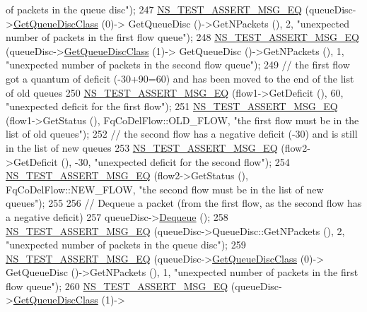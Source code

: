 \begin{DoxyCode}
{       of packets in the queue disc"});
247   \hyperlink{group__testing_ga2a9d78cffb3db8e867c35fff0b698cf5}{NS\_TEST\_ASSERT\_MSG\_EQ} (queueDisc->\hyperlink{classns3_1_1QueueDisc_a584d228f7bff3f754d32793a38134556}{GetQueueDiscClass} (0)->
      GetQueueDisc ()->GetNPackets (), 2, \textcolor{stringliteral}{"unexpected number of packets in the first flow queue"});
248   \hyperlink{group__testing_ga2a9d78cffb3db8e867c35fff0b698cf5}{NS\_TEST\_ASSERT\_MSG\_EQ} (queueDisc->\hyperlink{classns3_1_1QueueDisc_a584d228f7bff3f754d32793a38134556}{GetQueueDiscClass} (1)->
      GetQueueDisc ()->GetNPackets (), 1, \textcolor{stringliteral}{"unexpected number of packets in the second flow queue"});
249   \textcolor{comment}{// the first flow got a quantum of deficit (-30+90=60) and has been moved to the end of the list of old
       queues}
250   \hyperlink{group__testing_ga2a9d78cffb3db8e867c35fff0b698cf5}{NS\_TEST\_ASSERT\_MSG\_EQ} (flow1->GetDeficit (), 60, \textcolor{stringliteral}{"unexpected deficit for the first
       flow"});
251   \hyperlink{group__testing_ga2a9d78cffb3db8e867c35fff0b698cf5}{NS\_TEST\_ASSERT\_MSG\_EQ} (flow1->GetStatus (), FqCoDelFlow::OLD\_FLOW, \textcolor{stringliteral}{"the first flow
       must be in the list of old queues"});
252   \textcolor{comment}{// the second flow has a negative deficit (-30) and is still in the list of new queues}
253   \hyperlink{group__testing_ga2a9d78cffb3db8e867c35fff0b698cf5}{NS\_TEST\_ASSERT\_MSG\_EQ} (flow2->GetDeficit (), -30, \textcolor{stringliteral}{"unexpected deficit for the second
       flow"});
254   \hyperlink{group__testing_ga2a9d78cffb3db8e867c35fff0b698cf5}{NS\_TEST\_ASSERT\_MSG\_EQ} (flow2->GetStatus (), FqCoDelFlow::NEW\_FLOW, \textcolor{stringliteral}{"the second flow
       must be in the list of new queues"});
255 
256   \textcolor{comment}{// Dequeue a packet (from the first flow, as the second flow has a negative deficit)}
257   queueDisc->\hyperlink{classns3_1_1QueueDisc_a6c13fc489822c1487f61c2289f2e3629}{Dequeue} ();
258   \hyperlink{group__testing_ga2a9d78cffb3db8e867c35fff0b698cf5}{NS\_TEST\_ASSERT\_MSG\_EQ} (queueDisc->QueueDisc::GetNPackets (), 2, \textcolor{stringliteral}{"unexpected number
       of packets in the queue disc"});
259   \hyperlink{group__testing_ga2a9d78cffb3db8e867c35fff0b698cf5}{NS\_TEST\_ASSERT\_MSG\_EQ} (queueDisc->\hyperlink{classns3_1_1QueueDisc_a584d228f7bff3f754d32793a38134556}{GetQueueDiscClass} (0)->
      GetQueueDisc ()->GetNPackets (), 1, \textcolor{stringliteral}{"unexpected number of packets in the first flow queue"});
260   \hyperlink{group__testing_ga2a9d78cffb3db8e867c35fff0b698cf5}{NS\_TEST\_ASSERT\_MSG\_EQ} (queueDisc->\hyperlink{classns3_1_1QueueDisc_a584d228f7bff3f754d32793a38134556}{GetQueueDiscClass} (1)->

\end{DoxyCode}
